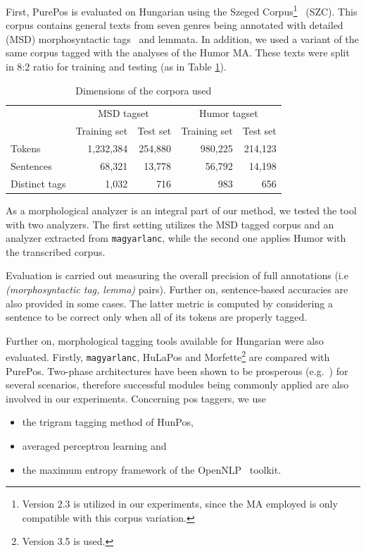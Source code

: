 First, PurePos is evaluated on Hungarian using the Szeged Corpus\footnote{Version 2.3 is utilized in our experiments, since the MA employed is only compatible with this corpus variation.}~\cite{Csendes2004} (SZC). 
This corpus contains general texts from seven genres being annotated with detailed (MSD) morphosyntactic tags~\cite{Erjavec2012} and lemmata.
In addition, we used a variant of the same corpus tagged with the analyses of the Humor MA. These texts were split in 8:2 ratio for training and testing (as in Table \ref{tab:szeged-corpus}). 

\begin{table}[H]
\centering
\caption{Dimensions of the corpora used}
\begin{tabular}{l r r r r}
  \hline
  & \multicolumn{2}{c}{MSD tagset} & \multicolumn{2}{c}{Humor tagset} \\
  &  Training set &  Test set &  Training set &  Test set  \\
  \hline
  Tokens &  1,232,384 &  254,880 &  980,225 &  214,123 \\
  Sentences &  68,321 &  13,778 &  56,792 &  14,198 \\
  Distinct tags &  1,032 &  716 &  983 &  656 \\
  \hline
\end{tabular}
\label{tab:szeged-corpus}
\end{table}

As a morphological analyzer is an integral part of our method, we tested the tool with two analyzers. 
The first setting utilizes the MSD tagged corpus and an analyzer extracted from \texttt{magyarlanc}, while the second one applies Humor with the transcribed corpus.

Evaluation is carried out measuring the overall precision of full annotations (i.e \emph{(morphosyntactic tag, lemma)} pairs). 
Further on, sentence-based accuracies are also provided in some cases. 
The latter metric is computed by considering a sentence to be correct only when all of its tokens are properly tagged. 

Further on, morphological tagging tools available for Hungarian were also evaluated. 
Firstly, \texttt{magyarlanc}, HuLaPos and Morfette\footnote{Version 3.5 is used.} are compared with PurePos.  
Two-phase architectures have been shown to be prosperous (e.g.~\cite{Agic2013,Erjavec2004}) for several scenarios, therefore successful modules being commonly applied are also involved in our experiments. 
Concerning \gls{pos} taggers, we use
\begin{itemize}
  \item the trigram tagging method of HunPos,
  \item averaged perceptron learning and
  \item the maximum entropy framework of the OpenNLP~\cite{Baldridge2002} toolkit.
\end{itemize}

